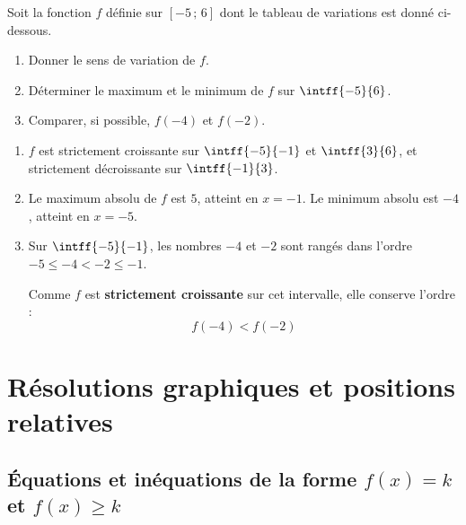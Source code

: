 \begin{methode}
	Soit la fonction $f$ définie sur $[-5\,;\,6]$ dont le tableau de variations est donné ci-dessous.

	\begin{center}
	\end{center}

	\begin{enumerate}
		\item Donner le sens de variation de $f$.
		\item Déterminer le maximum et le minimum de $f$ sur $\intff{-5}{6}$.
		\item Comparer, si possible, $f(-4)$ et $f(-2)$.
	\end{enumerate}

	\begin{correction}
		\nline
		\begin{enumerate}
			\item $f$ est strictement croissante sur $\intff{-5}{-1}$ et $\intff{3}{6}$, et strictement décroissante sur $\intff{-1}{3}$.
			\item Le maximum absolu de $f$ est $5$, atteint en $x = -1$. Le minimum absolu est $-4$, atteint en $x = -5$.
			\item Sur $\intff{-5}{-1}$, les nombres $-4$ et $-2$ sont rangés dans l'ordre $-5 \le -4 < -2 \le -1$.

			      Comme $f$ est \textbf{strictement croissante} sur cet intervalle, elle conserve l'ordre :
			      \[
				      f(-4) < f(-2)
			      \]
		\end{enumerate}
	\end{correction}
\end{methode}

\section{Résolutions graphiques et positions relatives}

\subsection{Équations et inéquations de la forme $f(x) = k$ et $f(x) \ge k$}

